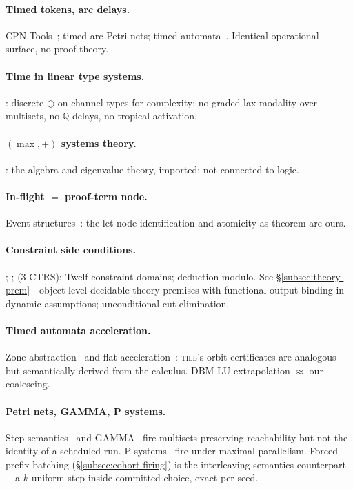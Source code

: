 \documentclass[11pt]{article}
\newcommand{\QQ}{\mathbb{Q}}                     %
\newcommand{\till}{\textsc{till}}                %
\theoremstyle{definition}
\theoremstyle{remark}
\begin{document}
\paragraph{Timed tokens, arc delays.}
CPN Tools~\cite{Jensen2007CPN,JensenKristensenWells2007}; timed-arc Petri nets;
timed automata~\cite{AlurDill1994}.
Identical operational surface, no proof theory.

\paragraph{Time in linear type systems.}
\cite{DasHoffmannPfenning2018}: discrete $\bigcirc$ on channel types for
complexity; no graded lax modality over multisets, no $\QQ$ delays, no tropical
activation.

\paragraph{$({\max},{+})$ systems theory.}
\cite{Baccelli1992}: the algebra and eigenvalue theory, imported; not connected to
logic.

\paragraph{In-flight $=$ proof-term node.}
Event structures~\cite{NielsenPlotkinWinskel1981}: the let-node identification
and atomicity-as-theorem are ours.

\paragraph{Constraint side conditions.}
\cite{LassezMcAloon1990}; \cite{NegriVonPlato1998};
\cite{Ohlebusch2002} (3-CTRS); Twelf constraint domains; deduction modulo.
See \S\ref{subsec:theory-prem}---object-level decidable theory premises with
functional output binding in dynamic assumptions; unconditional cut elimination.

\paragraph{Timed automata acceleration.}
Zone abstraction~\cite{BengtssonYi2004} and flat
acceleration~\cite{BoigelotFAST}: \till{}'s orbit certificates are analogous but
semantically derived from the calculus.  DBM LU-extrapolation $\approx$ our
coalescing.

\paragraph{Petri nets, GAMMA, P systems.}
Step semantics~\cite{BestDevillers1987} and GAMMA~\cite{BanatreLeMetayer1990}
fire multisets preserving reachability but not the identity of a scheduled run.
P systems~\cite{Paun2000} fire under maximal parallelism.  Forced-prefix batching
(\S\ref{subsec:cohort-firing}) is the interleaving-semantics counterpart---a
$k$-uniform step inside committed choice, exact per seed.
\end{document}
